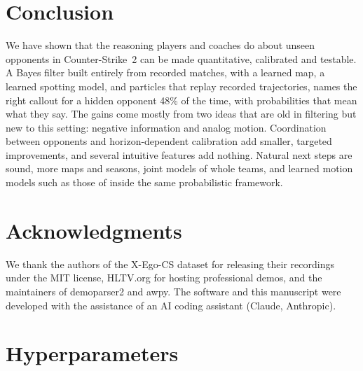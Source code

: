 \documentclass[11pt]{article}
\newcommand{\1}{\mathbb{1}}
\begin{document}
\section{Conclusion}
\label{sec:conclusion}
We have shown that the reasoning players and coaches do about unseen opponents in Counter-Strike~2 can be made quantitative, calibrated and testable. A Bayes filter built entirely from recorded matches, with a learned map, a learned spotting model, and particles that replay recorded trajectories, names the right callout for a hidden opponent 48\% of the time, with probabilities that mean what they say. The gains come mostly from two ideas that are old in filtering but new to this setting: negative information and analog motion. Coordination between opponents and horizon-dependent calibration add smaller, targeted improvements, and several intuitive features add nothing. Natural next steps are sound, more maps and seasons, joint models of whole teams, and learned motion models such as those of \citet{durst2024learning} inside the same probabilistic framework.

\section*{Acknowledgments}
We thank the authors of the X-Ego-CS dataset for releasing their recordings under the MIT license, HLTV.org for hosting professional demos, and the maintainers of demoparser2 and awpy. The software and this manuscript were developed with the assistance of an AI coding assistant (Claude, Anthropic).




\clearpage
\appendix

\section{Hyperparameters}
\label{app:hyper}
\end{document}
